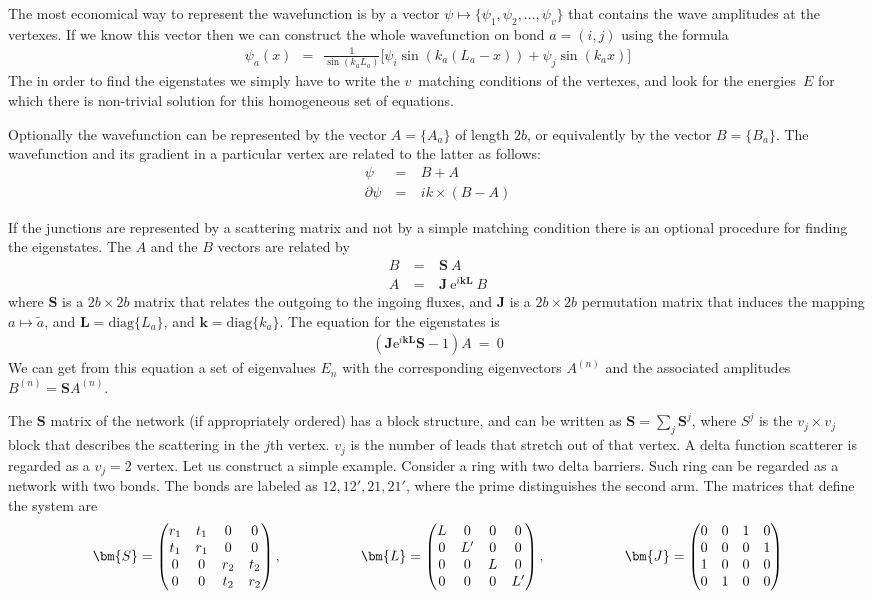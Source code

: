 \documentclass[onecolumn,fleqn]{revtex4}
\newcommand{\eexp}{\mathrm{e}^}
\newcommand{\amatrix}[1]{\begin{matrix} #1 \end{matrix}}
\newcommand{\beq}{\begin{eqnarray}}
\newcommand{\eeq}{\end{eqnarray}}
\begin{document}
The most economical way to represent the wavefunction is 
by a vector ${\psi \mapsto \{\psi_1,\psi_2,...,\psi_v\}}$ 
that contains the wave amplitudes at the vertexes. 
If we know this vector then we can construct the whole 
wavefunction on bond ${a=(i,j)}$ using the formula
\beq
\psi_a(x) \ \ = \ \ 
\frac{1}{\sin(k_aL_a)}
\Big[ 
\psi_i \sin(k_a(L_a{-}x))+\psi_j \sin(k_a x)
\Big]
\eeq
The in order to find the eigenstates we simply have 
to write the $v$~matching conditions of the vertexes, 
and look for the energies~$E$ for which there is non-trivial 
solution for this homogeneous set of equations.   


Optionally the wavefunction can be represented 
by the vector $A = \{A_a\}$ of length $2b$, 
or equivalently by the vector $B = \{ B_a \}$. 
The wavefunction and its gradient in a particular vertex 
are related to the latter as follows:    
\beq
\psi \ &=& \ B + A \\
\partial\psi \ &=& \ ik \times (B-A) 
\eeq

 

If the junctions are represented by a scattering matrix and 
not by a simple matching condition there is an optional 
procedure for finding the eigenstates. 
The $A$ and the $B$ vectors are related by 
\beq
B \ &=& \ \bm{S} \ A \\
A \ &=& \ \bm{J} \ \eexp{i\bm{k}\bm{L}} \ B 
\eeq
where $\bm{S}$ is a $2b\times 2b$ matrix 
that relates the outgoing to the ingoing fluxes,  
and $\bm{J}$ is a $2b\times 2b$ permutation matrix 
that induces the mapping $a\mapsto\tilde{a}$, 
and $\bm{L} = \mbox{diag}\{ L_a \}$, 
and  $\bm{k} = \mbox{diag}\{ k_a \}$.
The equation for the eigenstates is
\beq
\left(\bm{J}\eexp{i\bm{k}\bm{L}} \bm{S}-1\right) A \ = \ 0
\eeq
We can get from this equation 
a set of eigenvalues $E_n$ with the corresponding 
eigenvectors $A^{(n)}$ and the associated  
amplitudes $B^{(n)}=\bm{S}A^{(n)}$.


The $\bm{S}$ matrix of the network (if appropriately ordered) 
has a block structure, and can be written as 
$\bm{S} = \sum_j \bm{S}^j$, where $S^j$ is the $v_j\times v_j$ block 
that describes the scattering in the $j$th vertex.
$v_j$ is the number of leads that stretch out of that vertex.
A delta function scatterer is regarded as a $v_j=2$ vertex. 
Let us construct a simple example. 
Consider a ring with two delta barriers.
Such ring can be regarded as a network with 
two bonds. The bonds are labeled as   
$12,12',21,21'$, 
where the prime distinguishes the second arm.
The matrices that define the system are 
\beq
\bm{S} = \left(
\amatrix{
r_1 & t_1 & 0 & 0 \cr
t_1 & r_1 & 0 & 0 \cr
0 & 0 & r_2 & t_2 \cr
0 & 0 & t_2 & r_2 \cr
}\right),
\ \ \ \ \ \ \ \ \ \ \ \ \ \ \ \ \ 
\bm{L} = \left(
\amatrix{
L & 0 & 0 & 0 \cr
0 & L' & 0 & 0 \cr
0 & 0 & L & 0 \cr
0 & 0 & 0 & L' \cr
}\right), 
\ \ \ \ \ \ \ \ \ \ \ \ \ \ \ \ \ 
\bm{J} = \left(
\amatrix{
0 & 0 & 1 & 0 \cr
0 & 0 & 0 & 1 \cr
1 & 0 & 0 & 0 \cr
0 & 1 & 0 & 0 \cr
}\right)
\eeq
\end{document}
